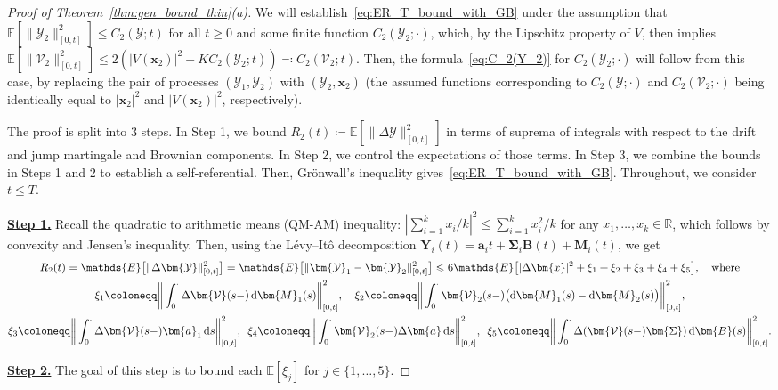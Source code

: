 \documentclass[en,oneside,bbfont,article]{amsart}
\theoremstyle{remark}
\theoremstyle{definition}
\theoremstyle{definition}
\newcommand\Y{\bm{\mathcal{Y}}}
\newcommand{\V}{\bm{\mathcal{V}}}
\newcommand\R{\mathbb{R}}
\newcommand\E{\mathds{E}}
\newcommand\1{\mathds{1}}
\renewcommand\le{\leqslant}
\renewcommand\ge{\geqslant}
\newcommand{\D}{\mathrm{d}}
\begin{document}
\begin{proof}[Proof of Theorem~\ref{thm:gen_bound_thin}(a)]
We will establish~\eqref{eq:ER_T_bound_with_GB} under the assumption that $\E[\|\Y_2\|^2_{[0,t]}]\le C_2(\Y;t)$ for all $t\ge 0$ and some finite function $C_2(\Y_2;\cdot)$, which, by the Lipschitz property of $V$, then implies $\E[\|\V_2\|^2_{[0,t]}]\le 2(|V(\bm{x}_2)|^2+KC_2(\Y_2;t))\eqqcolon C_{2}(\V_2;t)$. Then, the formula~\eqref{eq:C_2(Y_2)} for $C_2(\Y_2;\cdot)$ will follow from this case, by replacing the pair of processes $(\Y_1,\Y_2)$ with $(\Y_2,\bm{x}_2)$ (the assumed functions corresponding to $C_2(\Y;\cdot)$ and $C_2(\V_2;\cdot)$ being identically equal to $|\bm{x}_2|^2$ and $|V(\bm{x}_2)|^2$, respectively). 

The proof is split into 3 steps. In Step 1, we bound $R_2(t)\coloneqq \E[\|\Delta\Y\|_{[0,t]}^2]$ in terms of suprema of integrals with respect to the drift and jump martingale and Brownian components. In Step 2, we control the expectations of those terms. In Step 3, we combine the bounds in Steps 1 and 2 to establish a self-referential. Then, Gr\"onwall's inequality gives~\eqref{eq:ER_T_bound_with_GB}. Throughout, we consider $t\le T$.

\underline{\textbf{Step 1.}} Recall the quadratic to arithmetic means (QM-AM) inequality: $|\sum_{i=1}^k x_i/k|^2 \le \sum_{i=1}^k x_i^2/k$ for any $x_1,\ldots,x_k \in \R$, which follows by convexity and Jensen's inequality. Then, using the L\'evy--It\^o decomposition $\bm{Y}_i(t)=\bm{a}_i t+\bm\Sigma_i\bm{B}(t)+\bm{M}_i(t)$, we get
\begin{gather}
R_2(t)
=\E\big[\|\Delta\Y\|_{[0,t]}^2\big]
=\E\big[\|\Y_1-\Y_2\|_{[0,t]}^2\big]
\le 6
\E\big[|\Delta\bm{x}|^2+\xi_1+\xi_2+\xi_3+\xi_4+\xi_5
\big],
\quad\text{where}\label{eq:R(T)_gen_bound}
\\ \nonumber
\xi_1 \coloneqq \bigg\|\int_0^\cdot \Delta\V(s-)\,\D \bm{M}_1(s)\bigg\|_{[0,t]}^2,
\quad\xi_2\coloneqq \bigg\|\int_0^\cdot \V_2(s-)\big(\D \bm{M}_1(s)-\D \bm{M}_2(s)\big)\bigg\|_{[0,t]}^2, 
\\ \nonumber
\xi_3 \coloneqq \bigg\|\int_0^\cdot \Delta\V(s-)\bm{a}_1\,\D s\bigg\|_{[0,t]}^2, 
\enskip
\xi_4 \coloneqq \bigg\|\int_0^\cdot \V_2(s-)\Delta\bm{a}\,\D s\bigg\|_{[0,t]}^2,
\enskip
\xi_5\coloneqq
\bigg\|\int_0^\cdot \Delta(\V(s-)\bm{\Sigma})\,\D\bm{B}(s)\bigg\|_{[0,t]}^2.
\end{gather}

\underline{\textbf{Step 2.}}
The goal of this step is to bound each $\E[\xi_j]$ for $j\in\{1,\ldots,5\}$. 



\end{proof}
\end{document}
